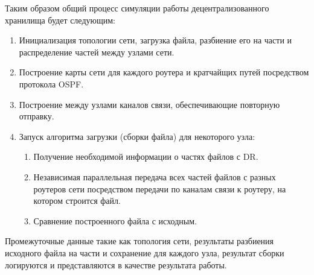 Таким образом общий процесс симуляции работы децентрализованного хранилища будет следующим:
\begin{enumerate}
    \item Инициализация топологии сети, загрузка файла, разбиение его на части и распределение частей между узлами сети.
    \item Построение карты сети для каждого роутера и кратчайщих путей посредством протокола OSPF.
    \item Построение между узлами каналов связи, обеспечивающие повторную отправку.
    \item Запуск алгоритма загрузки (сборки файла) для некоторого узла:
    \begin{enumerate}
        \item Получение необходимой информации о частях файлов с DR.
        \item Независимая параллельная передача всех частей файлов с разных роутеров сети посредством передачи по каналам связи к роутеру, на котором строится файл.
        \item Сравнение построенного файла с исходным.
    \end{enumerate}
\end{enumerate}

Промежуточные данные такие как топология сети, результаты разбиения исходного файла на части и сохранение для каждого узла, результат сборки логируются и представляются в качестве результата работы. 

